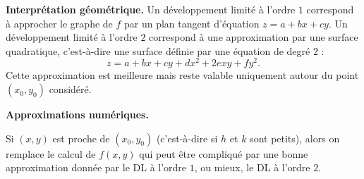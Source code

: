 \bigskip

\textbf{Interprétation géométrique.}
Un développement limité à l'ordre $1$ correspond à approcher le graphe de $f$ par un plan tangent d'équation $z=a +bx+cy$. 
Un développement limité à l'ordre $2$ correspond à une approximation par une surface quadratique, c'est-à-dire une surface définie par une équation de degré $2$ :
$$z=a +bx+cy + dx^2 + 2exy + fy^2.$$
Cette approximation est meilleure mais reste valable uniquement autour du point $(x_0,y_0)$ considéré.


\bigskip

\textbf{Approximations numériques.}

Si $(x,y)$ est proche de $(x_0,y_0)$ (c'est-à-dire si $h$ et $k$ sont petits), alors on remplace le calcul de $f(x,y)$ qui peut être compliqué par une bonne approximation donnée par le DL à l'ordre $1$, ou mieux, le DL à l'ordre $2$.

